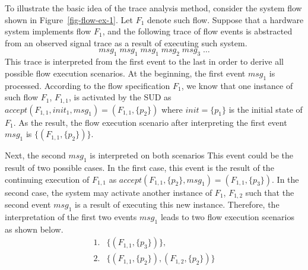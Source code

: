 \documentclass[12pt,frontmatter,copyright,thesis]{usfmanus}
\begin{document}

 To illustrate the basic idea of the trace analysis method, consider the system flow shown in Figure~\ref{fig-flow-ex-1}.  Let $F_1$ denote such flow.  Suppose that a hardware system implements flow $F_1$, and the following trace of flow events is abstracted from an observed signal trace as a result of executing such system.     
 \[
 \mathit{msg}_1\;\mathit{msg}_1\;\mathit{msg}_1\;\mathit{msg}_2\;\mathit{msg}_3\;\ldots
 \]  
 This trace is interpreted from the first event to the last in order to derive all possible flow execution scenarios.  At the beginning, the first event $\mathit{msg}_1$ is processed.  According to the flow specification $F_1$, we know that one instance of such flow $F_1$, $F_{1,1}$,  is activated by the SUD as $\mathit{accept}(F_{1,1}, init_1, \mathit{msg}_1) = (F_{1,1}, \{p_2\})$ where $\mathit{init} = \{p_1\}$ is the initial state of $F_1$.  As the result, the flow execution scenario after interpreting the first event $\mathit{msg_1}$ is $\{(F_{1,1}, \{p_2\})\}$.  

 Next, the second $\mathit{msg}_1$ is interpreted on both scenarios   This event could be the result of two possible cases.  In the first case, this event is the result of the continuing execution of $F_{1,1}$ as $\mathit{accept}(F_{1,1}, \{p_2\}, \mathit{msg}_1) = (F_{1,1}, \{p_3\})$.  In the second case, the system may activate another instance of $F_1$, $F_{1,2}$ such that the second event $\mathit{msg_1}$ is a result of executing this new instance.  Therefore, the interpretation of the first two events $\mathit{msg}_1$ leads to two flow execution scenarios as shown below.
 \[
 \label{tr-analy-s1}\tag{1}
 \begin{array}{cl}
 1. & \{(F_{1,1}, \{p_3\})\},\\
 2. & \{(F_{1,1}, \{p_2\}), (F_{1,2}, \{p_2\})\} 
 \end{array}
 \]
\end{document}
